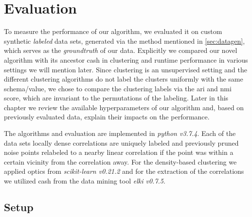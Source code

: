 \chapter{Evaluation}
To measure the performance of our algorithm, we evaluated  it on custom synthetic \textit{labeled} data sets, generated via the method mentioned in \autoref{sec:datagen}, which serves as the \textit{groundtruth} of our data. Explicitly we compared our novel algorithm with its ancestor \gls{cash} in clustering and runtime performance in various settings we will mention later. Since clustering is an unsupervised setting and the different clustering algorithms do not label the clusters uniformly with the same schema/value, we chose to compare the clustering labels via the \gls{ari}\cite{hubert1985comparingari} and \gls{nmi}\cite{strehl2002clusternmi} score, which are invariant to the permutations of the labeling. Later in this chapter we review the available hyperparameters of our algorithm and, based on previously evaluated data, explain their impacts on the performance.

The algorithms and evaluation are implemented in \textit{python v3.7.4}. Each of the data sets locally dense correlations are uniquely labeled and previously pruned noise points relabeled to a nearby linear correlation if the point was within a certain vicinity from the correlation away. For the density-based clustering we applied \gls{optics} from \textit{scikit-learn v0.21.2}\cite{pedregosa2011scikit} and for the extraction of the correlations we utilized \gls{cash} from the data mining tool \textit{\gls{elki} v0.7.5}\cite{achtert2008elki}. 



\section{Setup}\label{sec:setup}

